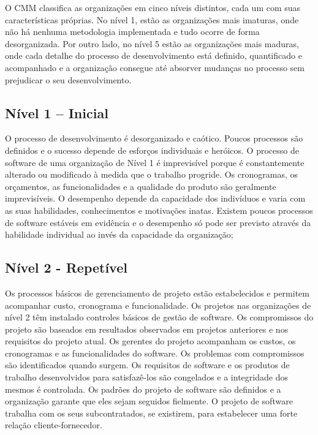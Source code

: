 O CMM classifica as organizações em cinco níveis distintos, cada um com suas
características próprias. No nível 1, estão as organizações mais imaturas, onde não há
nenhuma metodologia implementada e tudo ocorre de forma desorganizada. Por outro lado,
no nível 5 estão as organizações mais maduras, onde cada detalhe do processo de
desenvolvimento está definido, quantificado e acompanhado e a organização consegue até
absorver mudanças no processo sem prejudicar o seu desenvolvimento.

\subsection{Nível 1 – Inicial}

O processo de desenvolvimento é desorganizado e caótico. Poucos
processos são definidos e o sucesso depende de esforços individuais e heróicos. O processo
de software de uma organização de Nível 1 é imprevisível porque é constantemente
alterado ou modificado à medida que o trabalho progride. Os cronogramas, os orçamentos,
as funcionalidades e a qualidade do produto são geralmente imprevisíveis. O desempenho
depende da capacidade dos indivíduos e varia com as suas habilidades, conhecimentos e
motivações inatas. Existem poucos processos de software estáveis em evidência e o
desempenho só pode ser previsto através da habilidade individual ao invés da capacidade
da organização;

\subsection{Nível 2 - Repetível}

Os processos básicos de gerenciamento de projeto estão estabelecidos e permitem acompanhar custo, cronograma e funcionalidade. Os projetos nas organizações de nível 2 têm instalado controles básicos de gestão de software. Os compromissos do projeto são baseados em resultados observados em projetos anteriores e nos requisitos do projeto atual. Os gerentes do projeto acompanham os custos, os cronogramas e as funcionalidades do software. Os problemas com compromissos são identificados quando surgem. Os requisitos de software e os produtos de trabalho desenvolvidos para satisfazê-los são congelados e a integridade dos mesmos é controlada. Os padrões do projeto de software são definidos e a organização garante que eles sejam seguidos fielmente. O projeto de software trabalha com os seus subcontratados, se existirem, para estabelecer uma forte relação cliente-fornecedor.

